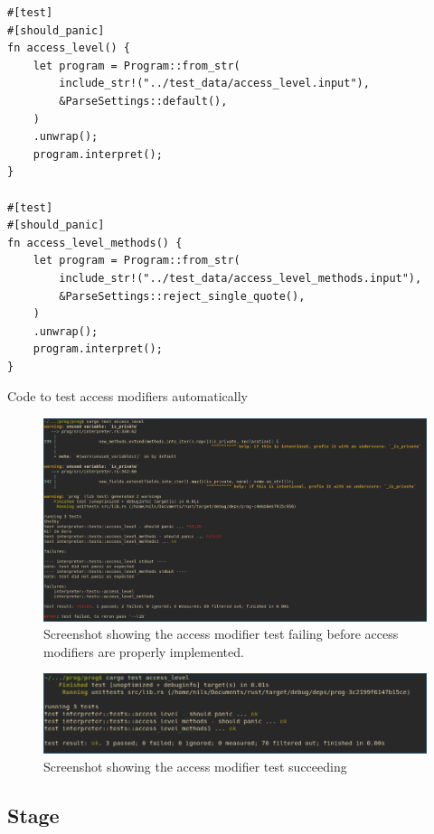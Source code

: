 \documentclass{article}
\newcommand{\subsecnum}{\the\value{subsection}}
\begin{document}
\begin{listing}
	\begin{verbatim}
#[test]
#[should_panic]
fn access_level() {
    let program = Program::from_str(
        include_str!("../test_data/access_level.input"),
        &ParseSettings::default(),
    )
    .unwrap();
    program.interpret();
}
                                                                 
#[test]
#[should_panic]
fn access_level_methods() {
    let program = Program::from_str(
        include_str!("../test_data/access_level_methods.input"),
        &ParseSettings::reject_single_quote(),
    )
    .unwrap();
    program.interpret();
}
	\end{verbatim}
	\caption{Code to test access modifiers automatically}
	\label{lst:access_level_test}
\end{listing}

\begin{figure}
	\includegraphics[width=\textwidth]{before_access_level}
	\caption{Screenshot showing the access modifier test failing before access
	modifiers are properly implemented.}
	\label{lst:before_access_level}
\end{figure}

\begin{figure}
	\includegraphics[width=\textwidth]{after_access_level}
	\caption{Screenshot showing the access modifier test succeeding}
	\label{lst:after_access_level}
\end{figure}

\subsection{Stage \subsecnum}
\end{document}

